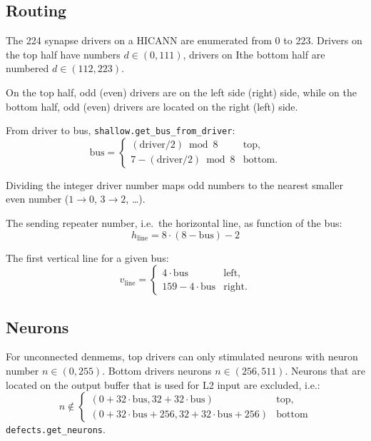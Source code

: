 \documentclass[a4paper]{article}
\newcommand{\func}[1]{\lstinline!#1!}
\begin{document}
\subsection{Routing}

The 224 synapse drivers on a HICANN are enumerated from 0 to
223. Drivers on the top half have numbers $d \in (0, 111)$, drivers on
Ithe bottom half are numbered $d \in (112,223)$.

On the top half, odd (even) drivers are on the left side (right) side,
while on the bottom half, odd (even) drivers are located on the right
(left) side.

From driver to bus, \func{shallow.get_bus_from_driver}:
%
\begin{equation}
  \text{bus} = \begin{cases}
    (\text{driver}/2)\bmod 8 & \text{top},\\
    7 - (\text{driver}/2)\bmod 8 & \text{bottom}.
  \end{cases}
\end{equation}

Dividing the integer driver number maps odd numbers to the nearest
smaller even number ($1\rightarrow 0$, $3\rightarrow 2$, \ldots).

The sending repeater number, i.e.\ the horizontal line, as function of the bus:
\begin{equation}
  h_{\text{line}} = 8 \cdot (8 - \text{bus}) - 2
\end{equation}

The first vertical line for a given bus:
\begin{equation}
  v_{\text{line}} =
  \begin{cases}
    4\cdot\text{bus} & \text{left},\\
    159 - 4\cdot\text{bus} & \text{right}.
  \end{cases}
\end{equation}

\subsection{Neurons}

For unconnected denmems, top drivers can only stimulated neurons with
neuron number $n \in (0, 255)$. Bottom drivers neurons $n \in (256,
511)$. Neurons that are located on the output buffer that is used for
L2 input are excluded, i.e.:
\begin{equation}
  n \notin
  \begin{cases}
    (0+32\cdot\text{bus}, 32+32\cdot\text{bus})  & \text{top},\\
    (0+32\cdot\text{bus}+256, 32+32\cdot\text{bus}+256) & \text{bottom}
  \end{cases}
\end{equation}
\func{defects.get_neurons}.
\end{document}
